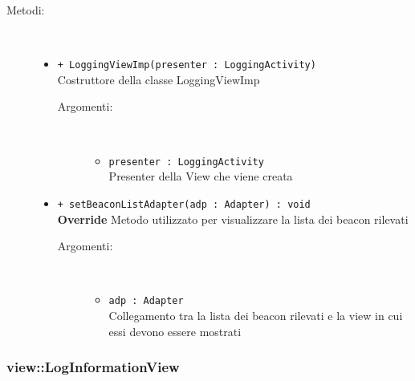 \documentclass[../DefinizioneDiProdotto.tex]{subfiles}
\begin{document}
\begin{description}
\begin{itemize}
\end{itemize}
\item[Metodi:] \
\begin{itemize}
\item \texttt{+ LoggingViewImp(presenter : LoggingActivity)}\\
Costruttore della classe LoggingViewImp
 \begin{description}
\item[Argomenti:] \
\begin{itemize}
\item \texttt{presenter : LoggingActivity}\\
Presenter della View che viene creata\end{itemize}
\end{description}
\item \texttt{+ setBeaconListAdapter(adp : Adapter) : void}\\
\textbf{Override} Metodo utilizzato per visualizzare la lista dei beacon rilevati 
 \begin{description}
\item[Argomenti:] \
\begin{itemize}
\item \texttt{adp : Adapter}\\
Collegamento tra la lista dei beacon rilevati e la view in cui essi devono essere mostrati\end{itemize}
\end{description}
\end{itemize}
\end{description}

\subsubsection{view::LogInformationView}
\end{document}
